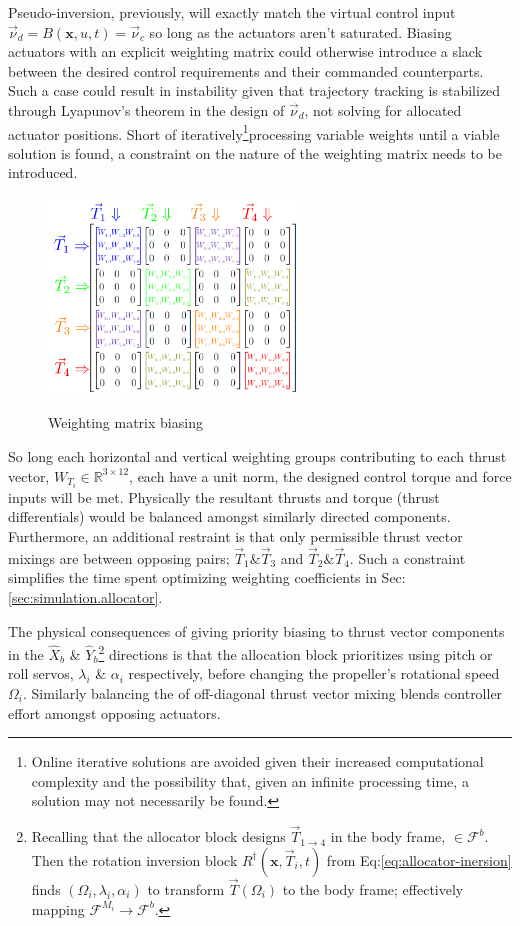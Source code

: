 {Pseudo-inversion, previously, will exactly match the virtual control input $\vec{\nu}_d=B(\mathbf{x},u,t)=\vec{\nu}_c$ so long as the actuators aren't saturated. Biasing actuators with an explicit weighting matrix could otherwise introduce a slack between the desired control requirements and their commanded counterparts. Such a case could result in instability given that trajectory tracking is stabilized through Lyapunov's theorem in the design of $\vec{\nu}_d$, not solving for allocated actuator positions. Short of iteratively\footnote{Online iterative solutions are avoided given their increased computational complexity and the possibility that, given an infinite processing time, a solution may not necessarily be found.}processing variable weights until a viable solution is found, a constraint on the nature of the weighting matrix needs to be introduced.
\begin{figure}[htbp]
\centering
\includegraphics[width=0.6\textwidth]{figs/weighted-matrix}
\label{fig:weighted-matrix}
\caption{Weighting matrix biasing}
\end{figure}
\par
So long each horizontal and vertical weighting groups contributing to each thrust vector, $W_{T_i}\in\mathbb{R}^{3\times 12}$, each have a unit norm, the designed control torque and force inputs will be met. Physically the resultant thrusts and torque (thrust differentials) would be balanced amongst similarly directed components. Furthermore, an additional restraint is that only permissible thrust vector mixings are between opposing pairs; $\vec{T}_1\text{\&}\vec{T}_3$ and $\vec{T}_2\text{\&}\vec{T}_4$. Such a constraint simplifies the time spent optimizing weighting coefficients in Sec:\ref{sec:simulation.allocator}.
\par
The physical consequences of giving priority biasing to thrust vector components in the $\hat{X}_b$ \& $\hat{Y}_b$\footnote{Recalling that the allocator block designs $\vec{T}_{1\rightarrow 4}$ in the body frame, $\in\mathcal{F}^b$. Then the rotation inversion block $R^\dagger(\mathbf{x},\vec{T}_i,t)$ from Eq:\ref{eq:allocator-inersion} finds $(\Omega_i,\lambda_i,\alpha_i)$ to transform $\vec{T}(\Omega_i)$ to the body frame; effectively mapping $\mathcal{F}^{M_i}\rightarrow\mathcal{F}^b$.} directions is that the allocation block prioritizes using pitch or roll servos, $\lambda_i$ \& $\alpha_i$ respectively, before changing the propeller's rotational speed $\Omega_i$. Similarly balancing the of off-diagonal thrust vector mixing blends controller effort amongst opposing actuators. 
}
